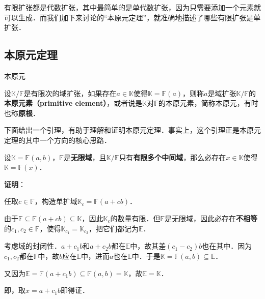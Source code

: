


有限扩张都是代数扩张，其中最简单的是单代数扩张，因为只需要添加一个元素就可以生成．而我们加下来讨论的“本原元定理”，就准确地描述了哪些有限扩张是单扩张．

\subsection{本原元定理}

\begin{definition}{本原元}\label{PrmtEl_def1}

设$\mathbb{K}/\mathbb{F}$是有限次的域扩张，如果存在$a\in\mathbb{K}$使得$\mathbb{K}=\mathbb{F}(a)$，则称$a$是域扩张$\mathbb{K}/\mathbb{F}$的\textbf{本原元素（primitive element）}，或者说是$\mathbb{K}$对$\mathbb{F}$的本原元素，简称本原元，有时也称\textbf{原根}．

\end{definition}

下面给出一个引理，有助于理解和证明本原元定理．事实上，这个引理正是本原元定理的其中一个方向的核心思路．


\begin{lemma}{}\label{PrmtEl_lem1}
设$\mathbb{K}=\mathbb{F}(a, b)$，$\mathbb{F}$是\textbf{无限域}，且$\mathbb{K}/\mathbb{F}$只有\textbf{有限多个中间域}，那么必存在$x\in\mathbb{K}$使得$\mathbb{K}=\mathbb{F}(x)$．
\end{lemma}

\textbf{证明}：

任取$c\in\mathbb{F}$，构造单扩域$\mathbb{K}_c=\mathbb{F}(a+cb)$．

由于$\mathbb{F}\subseteq\mathbb{F}(a+cb)\subseteq\mathbb{K}$，因此$\mathbb{K}_c$的数量有限．但$\mathbb{F}$是无限域，因此必存在\textbf{不相等}的$c_1, c_2\in\mathbb{F}$，使得$\mathbb{K}_{c_1}=\mathbb{K}_{c_2}$，把它们都记为$\mathbb{E}$．

考虑域的封闭性．$a+c_1b$和$a+c_2b$都在$\mathbb{E}$中，故其差$(c_1-c_2)b$也在其中．因为$c_1, c_2$都在$\mathbb{F}$中，故$b$应在$\mathbb{E}$中，进而$a$也在$\mathbb{E}$中．于是$\mathbb{K}=\mathbb{F}(a, b)\subseteq\mathbb{E}$．

又因为$\mathbb{E}=\mathbb{F}(a+c_1b)\subseteq\mathbb{F}(a, b)=\mathbb{K}$，故$\mathbb{E}=\mathbb{K}$．

即，取$x=a+c_1b$即得证．



